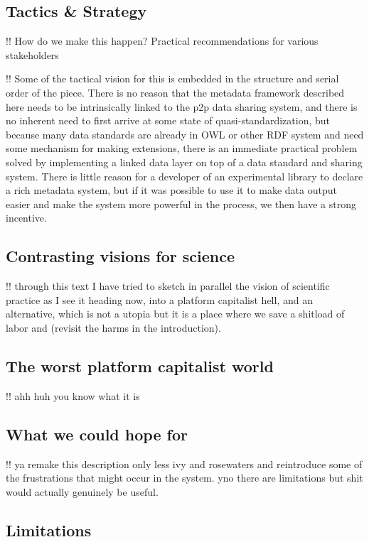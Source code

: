 \documentclass[10pt]{tufte-book}
\begin{document}
\subsection{Tactics \& Strategy}

!! How do we make this happen? Practical recommendations for various
stakeholders

!! Some of the tactical vision for this is embedded in the structure and
serial order of the piece. There is no reason that the metadata
framework described here needs to be intrinsically linked to the p2p
data sharing system, and there is no inherent need to first arrive at
some state of quasi-standardization, but because many data standards are
already in OWL or other RDF system and need some mechanism for making
extensions, there is an immediate practical problem solved by
implementing a linked data layer on top of a data standard and sharing
system. There is little reason for a developer of an experimental
library to declare a rich metadata system, but if it was possible to use
it to make data output easier and make the system more powerful in the
process, we then have a strong incentive.


\subsection{Contrasting visions for
science}

!! through this text I have tried to sketch in parallel the vision of
scientific practice as I see it heading now, into a platform capitalist
hell, and an alternative, which is not a utopia but it is a place where
we save a shitload of labor and (revisit the harms in the introduction).


\subsection{The worst platform capitalist
world}

!! ahh huh you know what it is


\subsection{What we could hope for}

!! ya remake this description only less ivy and rosewaters and
reintroduce some of the frustrations that might occur in the system. yno
there are limitations but shit would actually genuinely be useful.


\subsection{Limitations}
\end{document}
